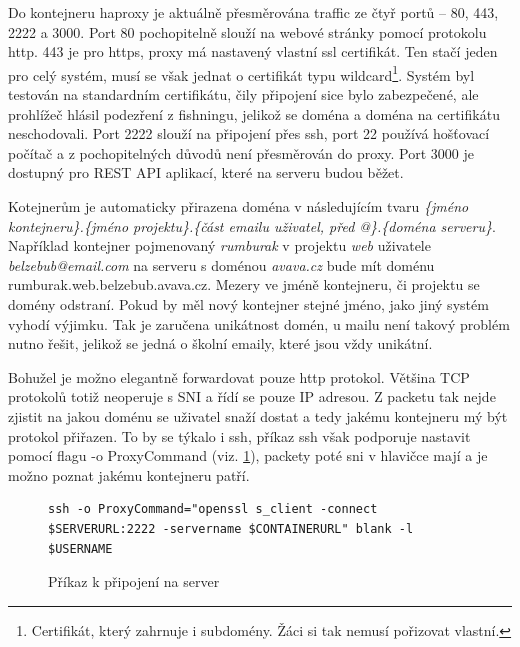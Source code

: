 \documentclass[a4paper,oneside,12pt]{report}
\begin{document}
Do kontejneru haproxy je aktuálně přesměrována traffic ze čtyř portů -- 80, 443, 2222 a 3000.
Port 80 pochopitelně slouží na webové stránky pomocí protokolu http.
443 je pro https, proxy má nastavený vlastní ssl certifikát.
Ten stačí jeden pro celý systém, musí se však jednat o certifikát typu wildcard\footnote{Certifikát, který zahrnuje i subdomény. Žáci si tak nemusí pořizovat vlastní.}.
Systém byl testován na standardním certifikátu, čily připojení sice bylo zabezpečené, ale prohlížeč hlásil podezření z fishningu, jelikož se doména a doména na certifikátu neschodovali.
Port 2222 slouží na připojení přes ssh, port 22 používá hošťovací počítač a z pochopitelných důvodů není přesměrován do proxy.
Port 3000 je dostupný pro REST API aplikací, které na serveru budou běžet.

Kotejnerům je automaticky přirazena doména v následujícím tvaru \textit{\{jméno kontejneru\}.\{jméno projektu\}.\{část emailu uživatel, před @\}.\{doména serveru\}}.
Například kontejner pojmenovaný \textit{rumburak} v projektu \textit{web} uživatele \textit{belzebub@email.com} na serveru s doménou \textit{avava.cz} bude mít doménu {rumburak.web.belzebub.avava.cz}.
Mezery ve jméně kontejneru, či projektu se domény odstraní.
Pokud by měl nový kontejner stejné jméno, jako jiný systém vyhodí výjimku.
Tak je zaručena unikátnost domén, u mailu není takový problém nutno řešit, jelikož se jedná o školní emaily, které jsou vždy unikátní.

Bohužel je možno elegantně forwardovat pouze http protokol.
Většina TCP protokolů totiž neoperuje s SNI a řídí se pouze IP adresou.
Z packetu tak nejde zjistit na jakou doménu se uživatel snaží dostat a tedy jakému kontejneru mý být protokol přiřazen.
To by se týkalo i ssh, příkaz ssh však podporuje nastavit pomocí flagu -o ProxyCommand (viz. \ref{fig:sshcom}), packety poté sni v hlavičce mají a je možno poznat jakému kontejneru patří.
\begin{figure}[h]
\begin{lstlisting}[breaklines]
ssh -o ProxyCommand="openssl s_client -connect $SERVERURL:2222 -servername $CONTAINERURL" blank -l $USERNAME
\end{lstlisting}
\caption[Příkaz k připojení na server, vlastní tvorba]{Příkaz k připojení na server\protect\footnotemark}
\label{fig:sshcom}
\end{figure}
\end{document}
